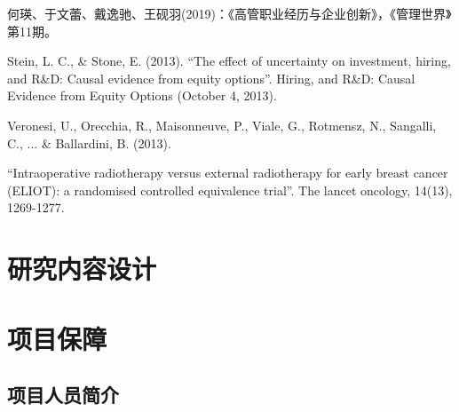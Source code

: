 \documentclass [UTF8] {ctexart}
\begin{document}
何瑛、于文蕾、戴逸驰、王砚羽(2019)：《高管职业经历与企业创新》，《管理世界》第11期。



Stein, L. C., \& Stone, E. (2013). “The effect of uncertainty on investment, hiring, and R\&D: Causal evidence from equity options”. Hiring, and R\&D: Causal Evidence from Equity Options (October 4, 2013).

Veronesi, U., Orecchia, R., Maisonneuve, P., Viale, G., Rotmensz, N., Sangalli, C., ... \& Ballardini, B. (2013). 

“Intraoperative radiotherapy versus external radiotherapy for early breast cancer (ELIOT): a randomised controlled equivalence trial”. The lancet oncology, 14(13), 1269-1277.
\section{研究内容设计}

\section{项目保障}
\subsection{项目人员简介}
\end{document}
